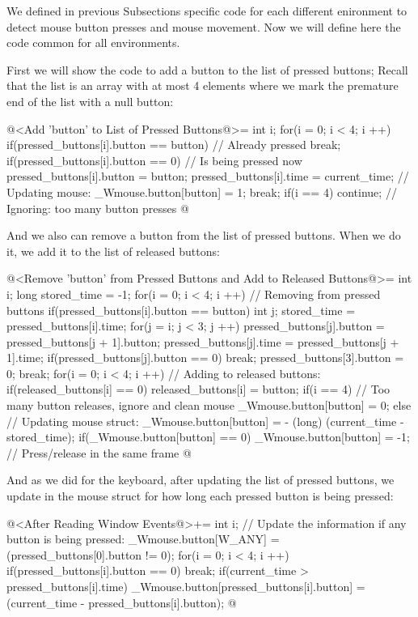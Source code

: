 
We defined in previous Subsections specific code for each different
enironment to detect mouse button presses and mouse movement. Now we
will define here the code common for all environments.

First we will show the code to add a button to the list of pressed
buttons; Recall that the list is an array with at most 4 elements
where we mark the premature end of the list with a null button:

\iniciocodigo
@<Add 'button' to List of Pressed Buttons@>=
{
  int i;
  for(i = 0; i < 4; i ++){
    if(pressed_buttons[i].button == button) // Already pressed
      break;
    if(pressed_buttons[i].button == 0){ // Is being pressed now
      pressed_buttons[i].button = button;
      pressed_buttons[i].time = current_time;
      // Updating mouse:
      _Wmouse.button[button] = 1;
      break;
    }
  }
  if(i == 4) continue; // Ignoring: too many button presses
}
@
\fimcodigo

And we also can remove a button from the list of pressed buttons. When
we do it, we add it to the list of released buttons:

\iniciocodigo
@<Remove 'button' from Pressed Buttons and Add to Released Buttons@>=
{
  int i;
  long stored_time = -1;
  for(i = 0; i < 4; i ++){ // Removing from pressed buttons
    if(pressed_buttons[i].button == button){
      int j;
      stored_time = pressed_buttons[i].time;
      for(j = i; j < 3; j ++){
        pressed_buttons[j].button = pressed_buttons[j + 1].button;
        pressed_buttons[j].time = pressed_buttons[j + 1].time;
        if(pressed_buttons[j].button == 0)
          break;
      }
      pressed_buttons[3].button = 0;
      break;
    }
  }
  for(i = 0; i < 4; i ++){ // Adding to released buttons:
    if(released_buttons[i] == 0)
      released_buttons[i] = button;
  }
  if(i == 4) // Too many button releases, ignore and clean mouse
    _Wmouse.button[button] = 0;
  else{
    // Updating mouse struct:
    _Wmouse.button[button] = - (long) (current_time - stored_time);
    if(_Wmouse.button[button] == 0)
      _Wmouse.button[button] = -1; // Press/release in the same frame
  }
}
@
\fimcodigo

And as we did for the keyboard, after updating the list of pressed
buttons, we update in the mouse struct for how long each pressed
button is being pressed:

\iniciocodigo
@<After Reading Window Events@>+=
{
  int i;
  // Update the information if any button is being pressed:
  _Wmouse.button[W_ANY] = (pressed_buttons[0].button != 0);
  for(i = 0; i < 4; i ++){
    if(pressed_buttons[i].button == 0)
      break;
    if(current_time > pressed_buttons[i].time)
      _Wmouse.button[pressed_buttons[i].button] =
        (current_time - pressed_buttons[i].button);
  }
}
@
\fimcodigo

